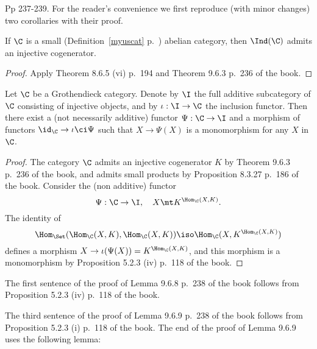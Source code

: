 \documentclass[12pt]{article}
\theoremstyle{remark}
\theoremstyle{definition}
\begin{document}


%

\begin{s}
Pp 237-239. For the reader's convenience we first reproduce (with minor changes) two corollaries with their proof. 

\begin{cor}[Corollary 9.6.5 p. 237]
If $\C$ is a small (Definition~\ref{myuscat} p.~) abelian category, then $\Ind(\C)$ admits an injective cogenerator.
\end{cor}

\begin{proof}
Apply Theorem 8.6.5 (vi) p.~194 and Theorem 9.6.3 p.~236 of the book.
\end{proof}

\begin{cor}[Corollary 9.6.6 p. 237]
Let $\C$ be a Grothendieck category. Denote by $\I$ the full additive subcategory of $\C$ consisting of injective objects, and by $\iota:\I\to\C$ the inclusion functor. Then there exist a (not necessarily additive) functor $\Psi:\C\to\I$ and a morphism of functors $\id_\C\to\iota\ci\Psi$ such that $X\to\Psi(X)$ is a monomorphism for any $X$ in $\C$.
\end{cor}

\begin{proof}
The category $\C$ admits an injective cogenerator $K$ by Theorem 9.6.3 p.~236 of the book, and admits small products by Proposition 8.3.27 p.~186 of the book. Consider the (non additive) functor 
$$
\Psi:\C\to\I,\quad X\mt K^{\Hom_\C(X,K)}.
$$ 
The identity of 
$$
\Hom_{\Set}(\Hom_\C(X,K),\Hom_\C(X,K))\iso\Hom_\C(X,K^{\Hom_\C(X,K)})
$$ 
defines a morphism $X\to\iota(\Psi(X))=K^{\Hom_\C(X,K)}$, and this morphism is a monomorphism by Proposition 5.2.3 (iv) p.~118 of the book. 
\end{proof}


The first sentence of the proof of Lemma 9.6.8 p.~238 of the book follows from Proposition 5.2.3 (iv) p.~118 of the book. 

The third sentence of the proof of Lemma 9.6.9 p.~238 of the book follows from Proposition 5.2.3 (i) p.~118 of the book. The end of the proof of Lemma 9.6.9 uses the following lemma:


\end{s}
\end{document}
